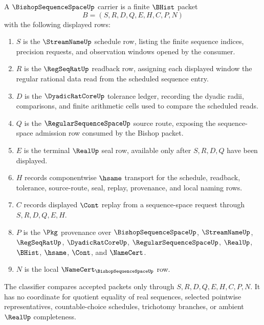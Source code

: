 \begin{definition}
\label{def:bishop-sequence-space-carrier}
A $\BishopSequenceSpaceUp$ carrier is a finite $\BHist$ packet
$$
B=(S,R,D,Q,E,H,C,P,N)
$$
with the following displayed rows:
\begin{enumerate}
\item $S$ is the $\StreamNameUp$ schedule row, listing the finite sequence indices, precision requests, and observation windows opened by the consumer.
\item $R$ is the $\RegSeqRatUp$ readback row, assigning each displayed window the regular rational data read from the scheduled sequence entry.
\item $D$ is the $\DyadicRatCoreUp$ tolerance ledger, recording the dyadic radii, comparisons, and finite arithmetic cells used to compare the scheduled reads.
\item $Q$ is the $\RegularSequenceSpaceUp$ source route, exposing the sequence-space admission row consumed by the Bishop packet.
\item $E$ is the terminal $\RealUp$ seal row, available only after $S,R,D,Q$ have been displayed.
\item $H$ records componentwise $\hsame$ transport for the schedule, readback, tolerance, source-route, seal, replay, provenance, and local naming rows.
\item $C$ records displayed $\Cont$ replay from a sequence-space request through $S,R,D,Q,E,H$.
\item $P$ is the $\Pkg$ provenance over $\BishopSequenceSpaceUp$, $\StreamNameUp$, $\RegSeqRatUp$, $\DyadicRatCoreUp$, $\RegularSequenceSpaceUp$, $\RealUp$, $\BHist$, $\hsame$, $\Cont$, and $\NameCert$.
\item $N$ is the local $\NameCert_{\BishopSequenceSpaceUp}$ row.
\end{enumerate}
The classifier compares accepted packets only through $S,R,D,Q,E,H,C,P,N$. It has no coordinate for quotient equality of real sequences, selected pointwise representatives, countable-choice schedules, trichotomy branches, or ambient $\RealUp$ completeness.
\end{definition}

